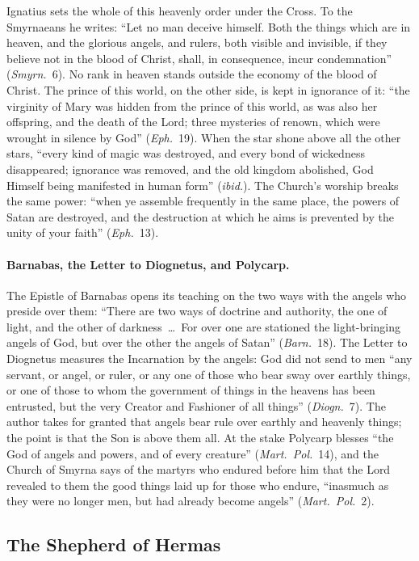 Ignatius sets the whole of this heavenly order under the Cross. To the
Smyrnaeans he writes: ``Let no man deceive himself. Both the things which
are in heaven, and the glorious angels, and rulers, both visible and
invisible, if they believe not in the blood of Christ, shall, in
consequence, incur condemnation'' (\emph{Smyrn.}\ 6). No rank in heaven
stands outside the economy of the blood of Christ. The prince of this
world, on the other side, is kept in ignorance of it: ``the virginity of
Mary was hidden from the prince of this world, as was also her offspring,
and the death of the Lord; three mysteries of renown, which were wrought
in silence by God'' (\emph{Eph.}\ 19). When the star shone above all the
other stars, ``every kind of magic was destroyed, and every bond of
wickedness disappeared; ignorance was removed, and the old kingdom
abolished, God Himself being manifested in human form'' (\emph{ibid.}).
The Church's worship breaks the same power: ``when ye assemble frequently
in the same place, the powers of Satan are destroyed, and the destruction
at which he aims is prevented by the unity of your faith'' (\emph{Eph.}\
13).

\paragraph{Barnabas, the Letter to Diognetus, and Polycarp.} The Epistle
of Barnabas opens its teaching on the two ways with the angels who preside
over them: ``There are two ways of doctrine and authority, the one of
light, and the other of darkness~\dots\ For over one are stationed the
light-bringing angels of God, but over the other the angels of Satan''
(\emph{Barn.}\ 18). The Letter to Diognetus measures the Incarnation by
the angels: God did not send to men ``any servant, or angel, or ruler, or
any one of those who bear sway over earthly things, or one of those to
whom the government of things in the heavens has been entrusted, but the
very Creator and Fashioner of all things'' (\emph{Diogn.}\ 7). The author
takes for granted that angels bear rule over earthly and heavenly things;
the point is that the Son is above them all. At the stake Polycarp blesses
``the God of angels and powers, and of every creature'' (\emph{Mart.\
Pol.}\ 14), and the Church of Smyrna says of the martyrs who endured
before him that the Lord revealed to them the good things laid up for
those who endure, ``inasmuch as they were no longer men, but had already
become angels'' (\emph{Mart.\ Pol.}\ 2).

\sectionguard
\subsection{The Shepherd of Hermas}\label{sec:fb-hermas}

